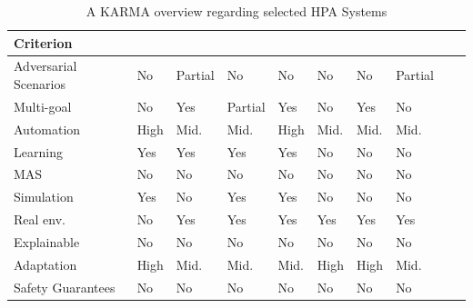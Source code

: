 \documentclass[conference]{IEEEtran}
\begin{document}
\begin{table}[h!]
    \centering
    \caption{A KARMA overview regarding selected HPA Systems}
    \label{tab:autoscaling_criteria}
    {\footnotesize
    \renewcommand{\arraystretch}{1.1}
    \begin{tabular}{>{\raggedright\arraybackslash}m{1.3cm}>{\centering\arraybackslash}m{0.6cm}>{\centering\arraybackslash}m{0.6cm}>{\centering\arraybackslash}m{0.6cm}>{\centering\arraybackslash}m{0.6cm}>{\centering\arraybackslash}m{0.6cm}>{\centering\arraybackslash}m{0.6cm}>{\centering\arraybackslash}m{0.6cm}>{\centering\arraybackslash}m{0.6cm}>{\centering\arraybackslash}m{0.6cm}}
    \hline
    \textbf{Criterion} & \vspace{-0.3cm}\textbf{\cite{gymhpa2022}} & \vspace{-0.3cm}\textbf{\cite{aware2023}} & \vspace{-0.3cm}\textbf{\cite{Rossi2019}} & \vspace{-0.3cm}\textbf{\cite{QoSRL}} & \vspace{-0.3cm}\textbf{\cite{Zhou2024}} & \vspace{-0.3cm}\textbf{\cite{KOSMOS}} & \vspace{-0.3cm}\textbf{\cite{COPA}} \\
    \hline
    \hline
    Adversarial Scenarios & No & Partial & No & No & No & No & Partial \\
    \hline
    Multi-goal & No & Yes & Partial & Yes & No & Yes & No \\
    \hline
    Automation & High & Mid. & Mid. & High & Mid. & Mid. & Mid. \\
    \hline
    Learning & Yes & Yes & Yes & Yes & No & No & No \\
    \hline
    MAS & No & No & No & No & No & No & No \\
    \hline
    Simulation & Yes & No & Yes & Yes & No & No & No \\
    \hline
    Real env. & No & Yes & Yes & Yes & Yes & Yes & Yes \\
    \hline
    Explainable & No & No & No & No & No & No & No \\
    \hline
    Adaptation & High & Mid. & Mid. & Mid. & High & High & Mid. \\
    \hline
    Safety Guarantees & No & No & No & No & No & No & No \\
    \hline
    \end{tabular}%
    }
  \end{table}
\end{document}
